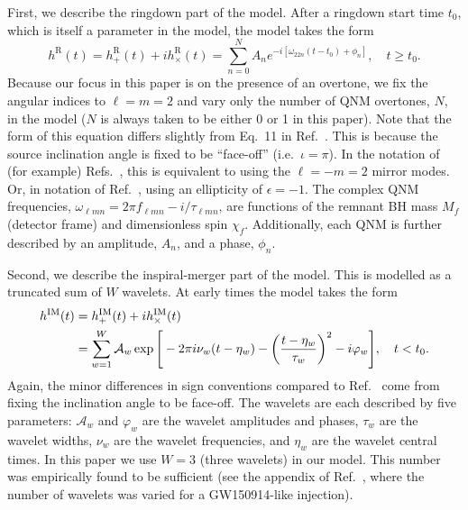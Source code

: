 First, we describe the ringdown part of the model.
After a ringdown start time $t_0$, which is itself a parameter in the model, the model takes the form
\begin{equation}\label{eq:ringdown_model}
    h^\mathrm{R}(t) = h_+^\mathrm{R}(t) + ih_\times^\mathrm{R}(t) = \sum_{n=0}^N A_n e^{-i[\omega_{22n}(t-t_0) + \phi_{n}]}, \quad t \geq t_0. 
\end{equation}
Because our focus in this paper is on the presence of an overtone, we fix the angular indices to $\ell = m = 2$ and vary only the number of QNM overtones, $N$, in the model ($N$ is always taken to be either 0 or 1 in this paper). 
Note that the form of this equation differs slightly from Eq.~11 in Ref.~\cite{Finch:2021qph}. This is because the source inclination angle is fixed to be ``face-off'' (i.e.\ $\iota=\pi$).
In the notation of (for example) Refs.~\cite{Dhani:2020nik, Finch:2021iip, MaganaZertuche:2021syq}, this is equivalent to using the $\ell = -m = 2$ mirror modes. 
Or, in notation of Ref.~\cite{Isi:2021iql}, using an ellipticity of $\epsilon = -1$.
The complex QNM frequencies, $\omega_{\ell m n} = 2\pi f_{\ell m n} - i/\tau_{\ell m n}$, are functions of the remnant BH mass $M_f$ (detector frame) and dimensionless spin $\chi_f$.
Additionally, each QNM is further described by an amplitude, $A_{n}$, and a phase, $\phi_{n}$. 

Second, we describe the inspiral-merger part of the model.
This is modelled as a truncated sum of $W$ wavelets.
At early times the model takes the form
\begin{align}\label{eq:wavelets}
	h^\mathrm{IM}(t) &=  h_+^\mathrm{IM}(t) + ih_\times^\mathrm{IM}(t) \nonumber \\
	&= \sum_{w=1}^{W} \mathcal{A}_w \exp \Bigg[-2\pi i \nu_w(t-\eta_w) - \qty(\frac{t-\eta_w}{\tau_w})^2 - i\varphi_w \Bigg], \quad t < t_0. 
\end{align}
Again, the minor differences in sign conventions compared to Ref.~\cite{Finch:2021qph} come from fixing the inclination angle to be face-off. 
The wavelets are each described by five parameters: $\mathcal{A}_w$ and $\varphi_w$ are the wavelet amplitudes and phases, $\tau_w$ are the wavelet widths, $\nu_w$ are the wavelet frequencies, and $\eta_w$ are the wavelet central times. 
In this paper we use $W=3$ (three wavelets) in our model.
This number was empirically found to be sufficient (see the appendix of Ref.~\cite{Finch:2021qph}, where the number of wavelets was varied for a GW150914-like injection).

